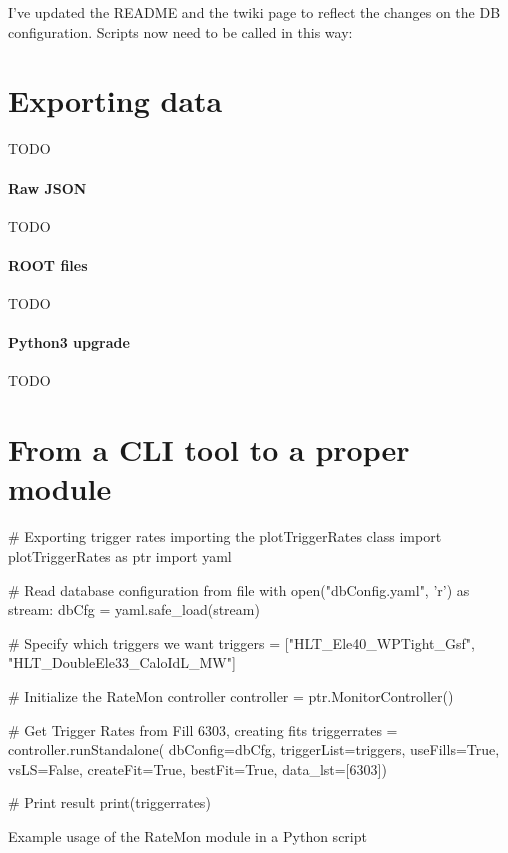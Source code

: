 I've updated the README and the twiki page to reflect the changes on the DB configuration. Scripts now need to be called in this way:


\section{Exporting data}

TODO

\paragraph{Raw JSON}

TODO

\paragraph{ROOT files}

TODO

\paragraph{Python3 upgrade}

TODO

\section{From a CLI tool to a proper module}

\begin{listing}[ht]
\begin{pythoncode}
# Exporting trigger rates importing the plotTriggerRates class
import plotTriggerRates as ptr
import yaml

# Read database configuration from file
with open("dbConfig.yaml", 'r') as stream:
    dbCfg = yaml.safe_load(stream)

# Specify which triggers we want
triggers = ["HLT_Ele40_WPTight_Gsf",
              "HLT_DoubleEle33_CaloIdL_MW"]

# Initialize the RateMon controller
controller = ptr.MonitorController()

# Get Trigger Rates from Fill 6303, creating fits
triggerrates = controller.runStandalone(
                         dbConfig=dbCfg,
                         triggerList=triggers,
                         useFills=True,
                         vsLS=False,
                         createFit=True,
                         bestFit=True,
                         data_lst=[6303])

# Print result
print(triggerrates)
\end{pythoncode}
\caption{Example usage of the RateMon module in a Python script}
\end{listing}

